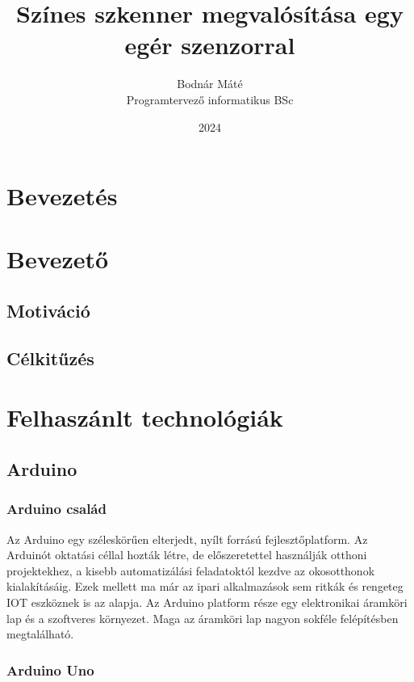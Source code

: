 \documentclass[
]{thesis-ekf}
\theoremstyle{definition}
\theoremstyle{remark}
\begin{document}
\title{Színes szkenner megvalósítása egy egér szenzorral}
\author{Bodnár Máté\\Programtervező informatikus BSc}
\date{2024}
\maketitle

\tableofcontents

\chapter*{Bevezetés}


\chapter{Bevezető}

\section{Motiváció}
\section{Célkitűzés}

\chapter{Felhaszánlt technológiák}
\section{Arduino}
\subsection{Arduino család}
Az Arduino egy széleskörűen elterjedt, nyílt forrású fejlesztőplatform. Az Arduinót oktatási céllal hozták létre, de előszeretettel használják otthoni projektekhez, a kisebb automatizálási feladatoktól kezdve az okosotthonok kialakításáig. Ezek mellett ma már az ipari alkalmazások sem ritkák és rengeteg IOT eszköznek is az alapja.
Az Arduino platform része egy elektronikai áramköri lap és a szoftveres környezet. Maga az áramköri lap nagyon sokféle felépítésben megtalálható.


\subsection{Arduino Uno}
\end{document}
